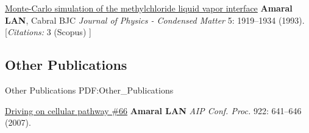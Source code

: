 \NumberedItem{\makebox[0.8cm][r]{[1]}}
\href{/people/amaral/monte-carlo-simulation-of-the-methylchloride-liquid-vapor-interface}
{Monte-Carlo simulation of the methylchloride liquid vapor interface}
\newline
{\textbf{Amaral LAN}}, Cabral BJC
\newline
\textit{Journal of Physics - Condensed Matter}
    5:
1919--1934 (1993).
    [{\em{Citations:}}  3 (Scopus) ]
\newline
\Gap
~
\Gap

\vspace*{0.2cm}\subsection
{Other Publications}
{Other Publications}
{PDF:Other_Publications}

\GapNoBreak
\NumberedItem{\makebox[0.8cm][r]{[1]}}
\href{/people/amaral/driving-on-cellular-pathway-66}
{Driving on cellular pathway \#66}
\newline
{\textbf{Amaral LAN}}
\newline
\textit{AIP Conf. Proc.}
    922:
641--646 (2007).
\newline
\Gap
~
\Gap

\vspace*{0.2cm}